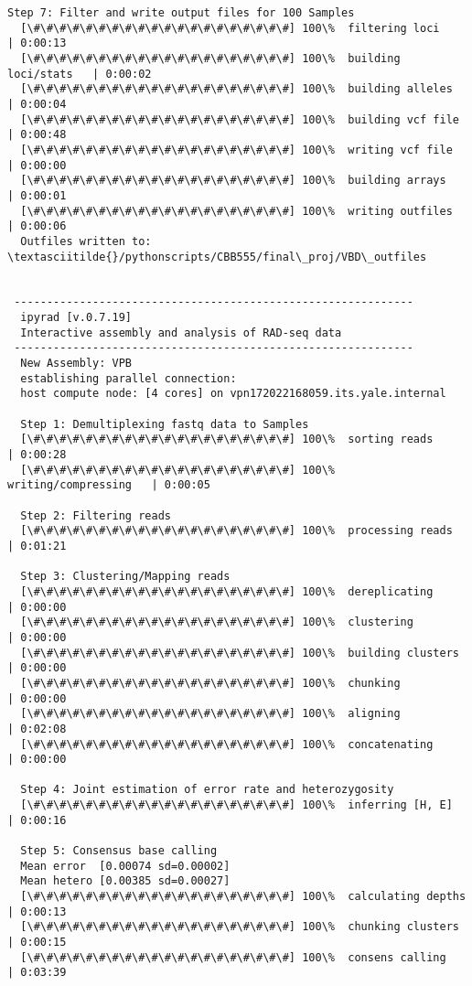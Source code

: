\documentclass[11pt]{article}
\begin{document}
\begin{Verbatim}[commandchars=\\\{\},fontsize=\footnotesize]
  Step 7: Filter and write output files for 100 Samples
  [\#\#\#\#\#\#\#\#\#\#\#\#\#\#\#\#\#\#\#\#] 100\%  filtering loci        | 0:00:13
  [\#\#\#\#\#\#\#\#\#\#\#\#\#\#\#\#\#\#\#\#] 100\%  building loci/stats   | 0:00:02
  [\#\#\#\#\#\#\#\#\#\#\#\#\#\#\#\#\#\#\#\#] 100\%  building alleles      | 0:00:04
  [\#\#\#\#\#\#\#\#\#\#\#\#\#\#\#\#\#\#\#\#] 100\%  building vcf file     | 0:00:48
  [\#\#\#\#\#\#\#\#\#\#\#\#\#\#\#\#\#\#\#\#] 100\%  writing vcf file      | 0:00:00
  [\#\#\#\#\#\#\#\#\#\#\#\#\#\#\#\#\#\#\#\#] 100\%  building arrays       | 0:00:01
  [\#\#\#\#\#\#\#\#\#\#\#\#\#\#\#\#\#\#\#\#] 100\%  writing outfiles      | 0:00:06
  Outfiles written to: \textasciitilde{}/pythonscripts/CBB555/final\_proj/VBD\_outfiles


 -------------------------------------------------------------
  ipyrad [v.0.7.19]
  Interactive assembly and analysis of RAD-seq data
 -------------------------------------------------------------
  New Assembly: VPB
  establishing parallel connection:
  host compute node: [4 cores] on vpn172022168059.its.yale.internal

  Step 1: Demultiplexing fastq data to Samples
  [\#\#\#\#\#\#\#\#\#\#\#\#\#\#\#\#\#\#\#\#] 100\%  sorting reads         | 0:00:28
  [\#\#\#\#\#\#\#\#\#\#\#\#\#\#\#\#\#\#\#\#] 100\%  writing/compressing   | 0:00:05

  Step 2: Filtering reads
  [\#\#\#\#\#\#\#\#\#\#\#\#\#\#\#\#\#\#\#\#] 100\%  processing reads      | 0:01:21

  Step 3: Clustering/Mapping reads
  [\#\#\#\#\#\#\#\#\#\#\#\#\#\#\#\#\#\#\#\#] 100\%  dereplicating         | 0:00:00
  [\#\#\#\#\#\#\#\#\#\#\#\#\#\#\#\#\#\#\#\#] 100\%  clustering            | 0:00:00
  [\#\#\#\#\#\#\#\#\#\#\#\#\#\#\#\#\#\#\#\#] 100\%  building clusters     | 0:00:00
  [\#\#\#\#\#\#\#\#\#\#\#\#\#\#\#\#\#\#\#\#] 100\%  chunking              | 0:00:00
  [\#\#\#\#\#\#\#\#\#\#\#\#\#\#\#\#\#\#\#\#] 100\%  aligning              | 0:02:08
  [\#\#\#\#\#\#\#\#\#\#\#\#\#\#\#\#\#\#\#\#] 100\%  concatenating         | 0:00:00

  Step 4: Joint estimation of error rate and heterozygosity
  [\#\#\#\#\#\#\#\#\#\#\#\#\#\#\#\#\#\#\#\#] 100\%  inferring [H, E]      | 0:00:16

  Step 5: Consensus base calling
  Mean error  [0.00074 sd=0.00002]
  Mean hetero [0.00385 sd=0.00027]
  [\#\#\#\#\#\#\#\#\#\#\#\#\#\#\#\#\#\#\#\#] 100\%  calculating depths    | 0:00:13
  [\#\#\#\#\#\#\#\#\#\#\#\#\#\#\#\#\#\#\#\#] 100\%  chunking clusters     | 0:00:15
  [\#\#\#\#\#\#\#\#\#\#\#\#\#\#\#\#\#\#\#\#] 100\%  consens calling       | 0:03:39


\end{Verbatim}
\end{document}
